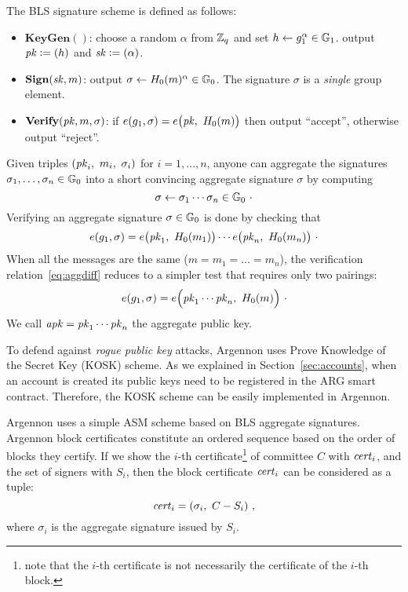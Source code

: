 The BLS signature scheme is defined as follows:

\begin{itemize}
    \item $\textbf{KeyGen}()$: choose a random $\alpha$ from $\mathbb{Z}_q$ and set $h \gets g_1^\alpha \in \mathbb{G}_1$.
    output $\mathit{pk} \mathrel{\mathop:}= (h)$ and $\mathit{sk} \mathrel{\mathop:}= (\alpha)$.
    \item $\textbf{Sign}(\mathit{sk}, m)$: output $\sigma \gets H_0(m)^\alpha \in \mathbb{G}_0$.
    The signature $\sigma$ is a \emph{single} group element.
    \item $\textbf{Verify}(\mathit{pk},m,\sigma)$: if $e(g_1, \sigma) = e\big(\PK,\ \Hm(m)\big)$  then output ``accept'',
    otherwise output ``reject''.
\end{itemize}

Given triples $(\PK_i,\ m_i,\ \sigma_i)$ for $i=1,\ldots,n$,
anyone can aggregate the signatures $\sigma_1,\ldots,\sigma_n \in \mathbb{G}_0$
into a short convincing aggregate signature $\sigma$ by computing
\begin{equation}
    \label{eq:agg}
    \sigma \gets \sigma_1 \cdots \sigma_n \in \mathbb{G}_0\ \cdot
\end{equation}
Verifying an aggregate signature $\sigma \in \mathbb{G}_0$ is done by checking that
\begin{equation}
    \label{eq:aggdiff}
    e(g_1, \sigma) = e\big(\PK_1,\ \Hm(m_1)\big) \cdots e\big(\PK_n,\ \Hm(m_n)\big)\ \cdot
\end{equation}
When all the messages are the same ($m = m_1 = \ldots = m_n$), the verification relation~\eqref{eq:aggdiff} reduces to
a simpler test that requires only two pairings:
\begin{equation}
    \label{eq:aggsame}
    e(g_1, \sigma) = e\Big(\PK_1 \cdots \PK_n,\ \Hm(m)\Big)\ \cdot
\end{equation}
We call $\mathit{apk}=\mathit{pk}_1 \cdots \mathit{pk}_n$ the aggregate public key.

To defend against \emph{rogue public key} attacks, Argennon uses Prove Knowledge of the Secret Key (KOSK) scheme. As we
explained in Section~\ref{sec:accounts}, when an account is created its public keys need to be registered in
the ARG smart contract. Therefore, the KOSK scheme can be easily implemented in Argennon.

Argennon uses a simple ASM scheme based on BLS aggregate signatures.
Argennon block certificates constitute an ordered sequence based on the order of blocks they certify. If we show
the $i$-th certificate\footnote{note that the $i$-th certificate is not
necessarily the certificate of the $i$-th block.} of committee $C$ with $\mathit{cert}_i$, and the set of signers
with $S_i$, then the block certificate $\mathit{cert}_i$ can be considered as a tuple:
\begin{equation}
    \C_i=(\sigma_i,\ C-S_{i})\label{eq:cert}\ ,
\end{equation}
where $\sigma_i$ is the aggregate signature issued by $S_i$.

